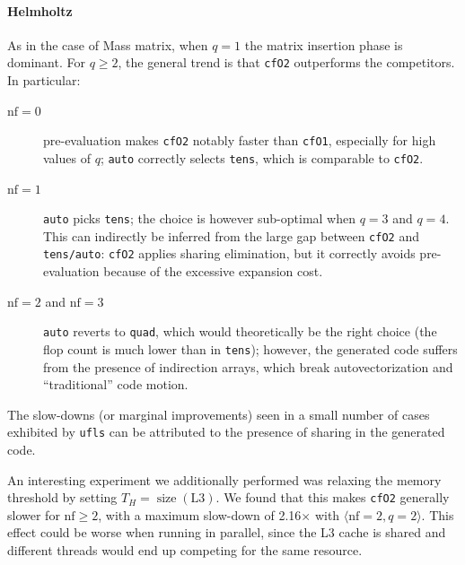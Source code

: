 \paragraph{Helmholtz}
As in the case of Mass matrix, when $q=1$ the matrix insertion phase is dominant. For $q \geq 2$, the general trend is that \texttt{cfO2} outperforms the competitors. In particular:
\begin{description}
\item[$\mathrm{nf}=0$] pre-evaluation makes \texttt{cfO2} notably faster than \texttt{cfO1}, especially for high values of $q$; \texttt{auto} correctly selects \texttt{tens}, which is comparable to \texttt{cfO2}. 
\item[$\mathrm{nf}=1$] \texttt{auto} picks \texttt{tens}; the choice is however sub-optimal when $q=3$ and $q=4$. This can indirectly be inferred from the large gap between \texttt{cfO2} and \texttt{tens/auto}: \texttt{cfO2} applies sharing elimination, but it correctly avoids pre-evaluation because of the excessive expansion cost.
\item[$\mathrm{nf}=2$ and $\mathrm{nf}=3$] \texttt{auto} reverts to \texttt{quad}, which would theoretically be the right choice (the flop count is much lower than in \texttt{tens}); however, the generated code suffers from the presence of indirection arrays, which break autovectorization and ``traditional'' code motion.
\end{description}

The slow-downs (or marginal improvements) seen in a small number of cases exhibited by \texttt{ufls} can be attributed to the presence of sharing in the generated code.

An interesting experiment we additionally performed was relaxing the memory threshold by setting $T_H = \operatorname{size}(\mathrm{L3})$. We found that this makes \texttt{cfO2} generally slower for $\mathrm{nf} \geq 2$, with a maximum slow-down of 2.16$\times$ with $\langle \mathrm{nf}=2, q=2\rangle$. This effect could be worse when running in parallel, since the L3 cache is shared and different threads would end up competing for the same resource.

